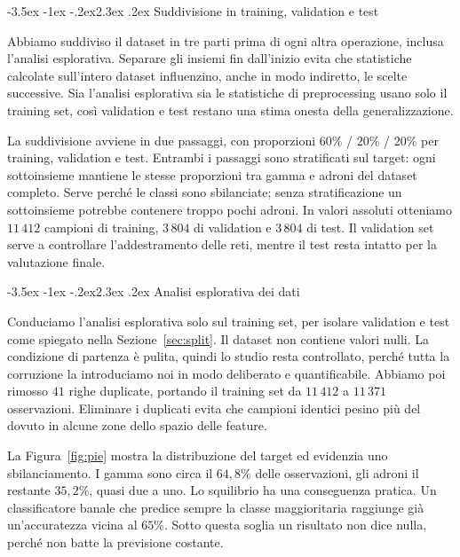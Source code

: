 \documentclass[12pt,a4paper]{article}
\makeatletter
\renewcommand\section{\@startsection{section}{1}{\z@}%
  {-3.5ex \@plus -1ex \@minus -.2ex}{2.3ex \@plus.2ex}%
  {\normalfont\Large\bfseries}}
\makeatother
\begin{document}
\section{Suddivisione in training, validation e test}\label{sec:split}

Abbiamo suddiviso il dataset in tre parti prima di ogni altra operazione, inclusa l'analisi
esplorativa. Separare gli insiemi fin dall'inizio evita che statistiche calcolate sull'intero dataset
influenzino, anche in modo indiretto, le scelte successive. Sia l'analisi esplorativa sia le
statistiche di preprocessing usano solo il training set, così validation e test restano una stima
onesta della generalizzazione.

La suddivisione avviene in due passaggi, con proporzioni $60\%$ / $20\%$ / $20\%$ per training,
validation e test. Entrambi i passaggi sono stratificati sul target: ogni sottoinsieme mantiene le
stesse proporzioni tra gamma e adroni del dataset completo. Serve perché le classi sono sbilanciate;
senza stratificazione un sottoinsieme potrebbe contenere troppo pochi adroni. In valori assoluti
otteniamo $11\,412$ campioni di training, $3\,804$ di validation e $3\,804$ di test. Il validation set
serve a controllare l'addestramento delle reti, mentre il test resta intatto per la valutazione finale.

\section{Analisi esplorativa dei dati}\label{sec:eda}

Conduciamo l'analisi esplorativa solo sul training set, per isolare validation e test come spiegato
nella Sezione~\ref{sec:split}. Il dataset non contiene valori nulli. La condizione di partenza è
pulita, quindi lo studio resta controllato, perché tutta la corruzione la introduciamo noi in
modo deliberato e quantificabile. Abbiamo poi rimosso $41$ righe duplicate, portando il training set
da $11\,412$ a $11\,371$ osservazioni. Eliminare i duplicati evita che campioni identici pesino più
del dovuto in alcune zone dello spazio delle feature.

La Figura~\ref{fig:pie} mostra la distribuzione del target ed evidenzia uno sbilanciamento. I gamma
sono circa il $64{,}8\%$ delle osservazioni, gli adroni il restante $35{,}2\%$, quasi due a uno. Lo
squilibrio ha una conseguenza pratica. Un classificatore banale che predice sempre la classe
maggioritaria raggiunge già un'accuratezza vicina al $65\%$. Sotto questa soglia un risultato non
dice nulla, perché non batte la previsione costante.
\end{document}
